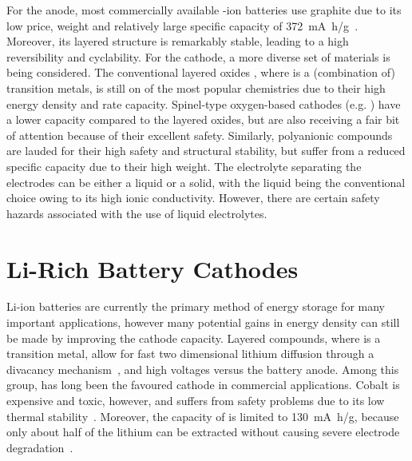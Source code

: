 \begin{refsection}
 
For the anode, most commercially available -ion batteries use graphite 
due to its low price, weight and relatively large specific capacity of 
372~\si{\milli\ampere\hour/\gram}~\cite{Mao2018}. Moreover, its layered 
structure is remarkably stable, leading to  a high reversibility and 
cyclability. For the cathode, a more diverse set of materials is being 
considered. The conventional layered oxides , where  is a 
(combination of) transition metals, is still on of the most popular 
chemistries due to their high energy density and rate capacity. Spinel-type 
oxygen-based cathodes (e.g. ) have a lower capacity compared to 
the layered oxides, but are also receiving a fair bit of attention because of 
their excellent safety. Similarly, polyanionic compounds are lauded for their 
high safety and structural stability, but suffer from a reduced specific 
capacity due to their high weight. The electrolyte separating the electrodes 
can be either a liquid or a solid, 
with the liquid being the conventional choice owing to its high ionic 
conductivity. However, there are certain safety hazards associated with the 
use of liquid electrolytes. 

\section{Li-Rich Battery Cathodes} \label{batteries:sec-lirich} 
 
Li-ion batteries are currently the primary method of energy storage for many 
important applications, however many potential gains in energy density can 
still be made by improving the cathode capacity. Layered  compounds, 
where  is a transition metal, allow for fast two dimensional lithium 
diffusion through a divacancy mechanism~\cite{VanderVen2001}, and high 
voltages versus the battery anode. Among this group,  has long been 
the favoured cathode in commercial applications. Cobalt is expensive and 
toxic, however, and suffers from safety problems due to its low thermal 
stability~\cite{Larcher2015}. Moreover, the capacity of  is limited 
to 130~\si{\milli\ampere\hour/\gram}, because only about half of the lithium 
can be extracted without causing severe electrode 
degradation~\cite{Rozier2015}. 
 

\end{refsection}

